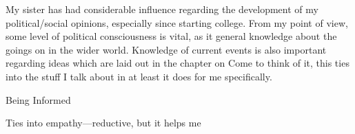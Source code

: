 \documentclass[../butidigress.tex]{subfiles}
\begin{document}
My sister has had considerable influence regarding the development of my political/social opinions, especially since starting college.
From my point of view, some level of political consciousness is vital, as it general knowledge about the goings on in the wider world.
Knowledge of current events is also important regarding ideas which are laid out in the chapter on 
Come to think of it, this ties into the stuff I talk about in  at least it does for me specifically.

\begin{somenotes}{Being Informed}
    \item Ties into empathy---reductive, but it helps me 
\end{somenotes}
\end{document}
